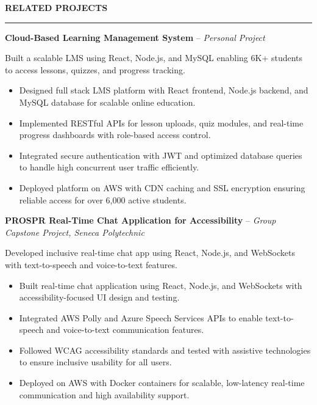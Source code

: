 \documentclass[10pt,letterpaper]{article}
\begin{document}
\vspace{6pt}

\textbf{RELATED PROJECTS}\\[-8pt]
\noindent\rule{\textwidth}{1pt}

\vspace{-2pt}

\textbf{Cloud-Based Learning Management System} -- \emph{Personal Project}

\vspace{-1pt}

Built a scalable LMS using React, Node.js, and MySQL enabling 6K+ students to access lessons, quizzes, and progress tracking.
\vspace{-1pt}
\begin{itemize}
\item Designed full stack LMS platform with React frontend, Node.js backend, and MySQL database for scalable online education.
\item Implemented RESTful APIs for lesson uploads, quiz modules, and real-time progress dashboards with role-based access control.
\item Integrated secure authentication with JWT and optimized database queries to handle high concurrent user traffic efficiently.
\item Deployed platform on AWS with CDN caching and SSL encryption ensuring reliable access for over 6,000 active students.
\end{itemize}

\textbf{PROSPR  Real-Time Chat Application for Accessibility} -- \emph{Group Capstone Project, Seneca Polytechnic}

\vspace{-1pt}

Developed inclusive real-time chat app using React, Node.js, and WebSockets with text-to-speech and voice-to-text features.
\vspace{-1pt}
\begin{itemize}
\item Built real-time chat application using React, Node.js, and WebSockets with accessibility-focused UI design and testing.
\item Integrated AWS Polly and Azure Speech Services APIs to enable text-to-speech and voice-to-text communication features.
\item Followed WCAG accessibility standards and tested with assistive technologies to ensure inclusive usability for all users.
\item Deployed on AWS with Docker containers for scalable, low-latency real-time communication and high availability support.
\end{itemize}
\end{document}

